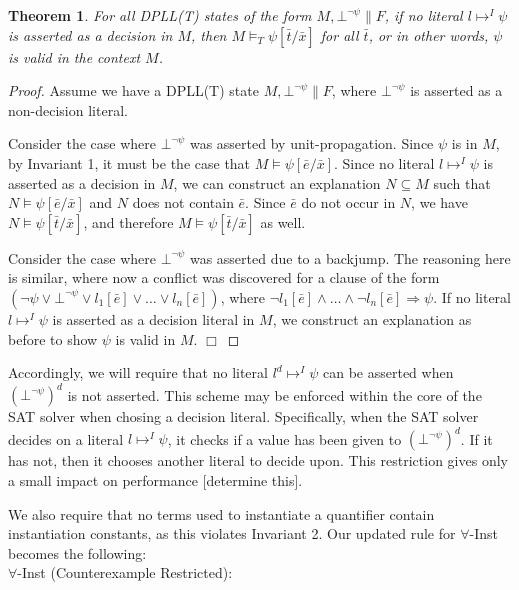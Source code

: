 \documentclass{llncs}
\newtheorem{thm}{Theorem}
\begin{document}
\begin{thm}
For all DPLL(T) states of the form $M, \bot^{\neg \psi} \parallel F$, if no literal $l \mapsto^I \psi$ is asserted as a decision in $M$, then $M \models_T \psi[\bar{t}/\bar{x}]$ for all $\bar{t}$, or in other words, $\psi$ is valid in the context $M$.
\end{thm}
\begin{proof}
Assume we have a DPLL(T) state $M, \bot^{\neg \psi} \parallel F$, where $\bot^{\neg \psi}$ is asserted as a non-decision literal.

Consider the case where $\bot^{\neg \psi}$ was asserted by unit-propagation.
Since $\psi$ is in $M$, by Invariant 1, it must be the case that $M \models \psi[\bar{e}/\bar{x}]$.
Since no literal $l \mapsto^I \psi$ is asserted as a decision in $M$, we can construct an explanation $N \subseteq M$ such that $N \models \psi[\bar{e}/\bar{x}]$ and $N$ does not contain $\bar{e}$.
Since $\bar{e}$ do not occur in $N$, we have $N \models \psi[\bar{t}/\bar{x}]$, and therefore $M \models \psi[\bar{t}/\bar{x}]$ as well.

Consider the case where $\bot^{\neg \psi}$ was asserted due to a backjump.
The reasoning here is similar, where now a conflict was discovered for a clause of the form $( \neg \psi \vee \bot^{\neg \psi} \vee l_1[\bar{e}] \vee \ldots \vee l_n[\bar{e}])$, where $\neg l_1[\bar{e}] \wedge \ldots \wedge \neg l_n[\bar{e}] \Rightarrow \psi$.
If no literal $l \mapsto^I \psi$ is asserted as a decision literal in $M$, we construct an explanation as before to show $\psi$ is valid in $M$.
$\Box$
\end{proof}

Accordingly, we will require that no literal $l^d \mapsto^I \psi$ can be asserted when $(\bot^{\neg \psi})^d$ is not asserted.
This scheme may be enforced within the core of the SAT solver when chosing a decision literal.
Specifically, when the SAT solver decides on a literal $l \mapsto^I \psi$, it checks if a value has been given to $(\bot^{\neg \psi})^d$.
If it has not, then it chooses another literal to decide upon.
This restriction gives only a small impact on performance [determine this].

We also require that no terms used to instantiate a quantifier contain instantiation constants, as this violates Invariant 2.
Our updated rule for $\forall$-Inst becomes the following: \\

\noindent $\forall$-Inst (Counterexample Restricted): \\
\end{document}
